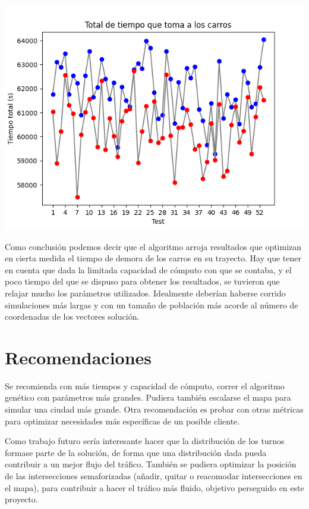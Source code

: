 \documentclass[colorinlistoftodos,twoside,twocolumn]{article} %
\begin{document}
	\begin{center}
		\includegraphics[width=\columnwidth]{graphic_total_time_take_cars.png}
	\end{center}

	Como conclusi\'on podemos decir que el algoritmo arroja resultados que optimizan en cierta medida el tiempo de demora de los carros en su trayecto. Hay que tener en cuenta que dada la limitada capacidad de c\'omputo con que se contaba, y el poco tiempo del que se dispuso para obtener los resultados, se tuvieron que relajar mucho los par\'ametros utilizados. Idealmente deber\'ian haberse corrido simulaciones m\'as largas y con un tama\~no de poblaci\'on m\'as acorde al n\'umero de coordenadas de los vectores soluci\'on.

	\section{Recomendaciones}
	
	Se recomienda con m\'as tiempos y capacidad de c\'omputo, correr el algoritmo gen\'etico con par\'ametros m\'as grandes. Pudiera tambi\'en escalarse el mapa para simular una ciudad m\'as grande. Otra recomendaci\'on es probar con otras m\'etricas para optimizar  necesidades m\'as espec\'ificas de un posible cliente.
	
	Como trabajo futuro ser\'ia interesante hacer que la distribuci\'on de los turnos formase parte de la soluci\'on, de forma que una distribuci\'on dada pueda contribuir a un mejor flujo del tr\'afico. Tambi\'en se pudiera optimizar la posici\'on de las intersecciones semaforizadas (a\~nadir, quitar o reacomodar intersecciones en el mapa), para contribuir a hacer el tr\'afico m\'as fluido, objetivo perseguido en este proyecto.
	
\end{document}
